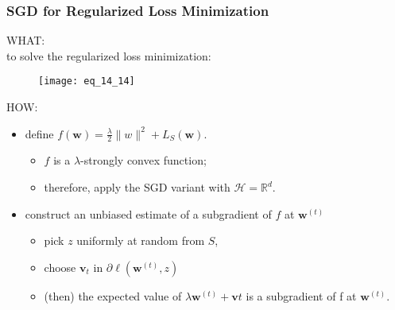 \begin{frame}
\frametitle{SGD for Regularized Loss Minimization}

WHAT:\\
to solve the regularized loss minimization:
\begin{figure}
    \centering
    \texttt{[image: eq\_14\_14]}
\end{figure}

HOW:\\
\begin{itemize}
\item define $f(\mathbf{w}) = \frac{\lambda}{2} \parallel w \parallel^2 + L_S(\mathbf{w})$.
    \begin{itemize}
        \item $f$ is a $\lambda$-strongly convex function;
        \item therefore, apply the SGD variant with $\mathcal{H} = \mathbb{R}^d$.
    \end{itemize}
\item construct an unbiased estimate of a subgradient of $f$ at $\mathbf{w}^{(t)}$
    \begin{itemize}
        \item pick $z$ uniformly at random from $S$,
        \item choose $\mathbf{v}_t$ in $\partial \ell(\mathbf{w}^{(t)}, z)$
        \item (then) the expected value of $\lambda \mathbf{w}^{(t)} + \mathbf{v}t$ is a subgradient of f at $\mathbf{w}^{(t)}$.
    \end{itemize}
\end{itemize}

\end{frame}


